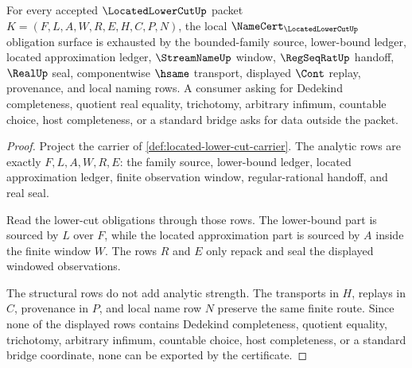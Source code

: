 \begin{theorem}
\label{thm:located-lower-cut-namecert-obligations}
For every accepted $\LocatedLowerCutUp$ packet $K=(F,L,A,W,R,E,H,C,P,N)$, the local $\NameCert_{\LocatedLowerCutUp}$ obligation surface is exhausted by the bounded-family source, lower-bound ledger, located approximation ledger, $\StreamNameUp$ window, $\RegSeqRatUp$ handoff, $\RealUp$ seal, componentwise $\hsame$ transport, displayed $\Cont$ replay, provenance, and local naming rows. A consumer asking for Dedekind completeness, quotient real equality, trichotomy, arbitrary infimum, countable choice, host completeness, or a standard bridge asks for data outside the packet.
\end{theorem}
\begin{proof}
Project the carrier of \autoref{def:located-lower-cut-carrier}. The analytic rows are exactly $F,L,A,W,R,E$: the family source, lower-bound ledger, located approximation ledger, finite observation window, regular-rational handoff, and real seal.

Read the lower-cut obligations through those rows. The lower-bound part is sourced by $L$ over $F$, while the located approximation part is sourced by $A$ inside the finite window $W$. The rows $R$ and $E$ only repack and seal the displayed windowed observations.

The structural rows do not add analytic strength. The transports in $H$, replays in $C$, provenance in $P$, and local name row $N$ preserve the same finite route. Since none of the displayed rows contains Dedekind completeness, quotient equality, trichotomy, arbitrary infimum, countable choice, host completeness, or a standard bridge coordinate, none can be exported by the certificate.
\end{proof}

